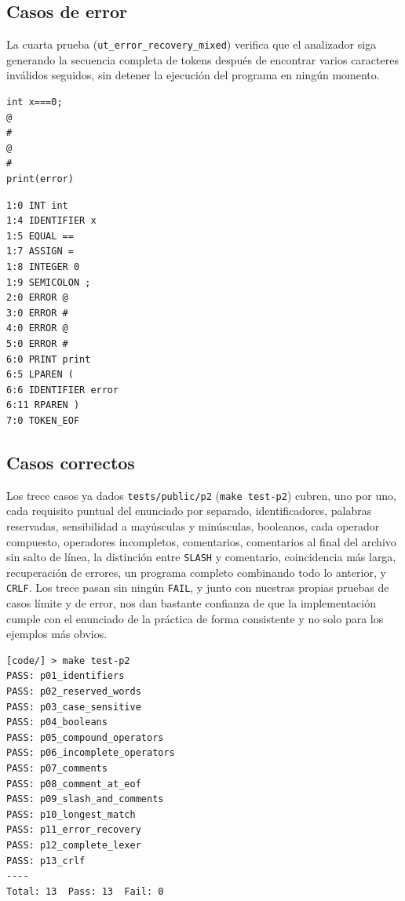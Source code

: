 \documentclass[12pt,letterpaper]{article}
\begin{document}
\subsection*{Casos de error}

La cuarta prueba (\texttt{ut\_error\_recovery\_mixed}) verifica que el analizador siga generando la secuencia
completa de tokens después de encontrar varios caracteres inválidos seguidos, sin detener la ejecución del
programa en ningún momento.

\begin{verbatim}
int x===0;
@
#
@
#
print(error)
\end{verbatim}

\begin{verbatim}
1:0 INT int
1:4 IDENTIFIER x
1:5 EQUAL ==
1:7 ASSIGN =
1:8 INTEGER 0
1:9 SEMICOLON ;
2:0 ERROR @
3:0 ERROR #
4:0 ERROR @
5:0 ERROR #
6:0 PRINT print
6:5 LPAREN (
6:6 IDENTIFIER error
6:11 RPAREN )
7:0 TOKEN_EOF
\end{verbatim}

\subsection*{Casos correctos}

Los trece casos ya dados \texttt{tests/public/p2} (\texttt{make test-p2}) cubren, uno por uno, cada
requisito puntual del enunciado por separado, identificadores, palabras reservadas, sensibilidad a mayúsculas
y minúsculas, booleanos, cada operador compuesto, operadores incompletos, comentarios, comentarios al final
del archivo sin salto de línea, la distinción entre \texttt{SLASH} y comentario, coincidencia más larga,
recuperación de errores, un programa completo combinando todo lo anterior, y \texttt{CRLF}. Los trece pasan
sin ningún \texttt{FAIL}, y junto con nuestras propias pruebas de casos límite y de error, nos dan bastante
confianza de que la implementación cumple con el enunciado de la práctica de forma consistente y no solo para
los ejemplos más obvios.

\begin{verbatim}
[code/] > make test-p2
PASS: p01_identifiers
PASS: p02_reserved_words
PASS: p03_case_sensitive
PASS: p04_booleans
PASS: p05_compound_operators
PASS: p06_incomplete_operators
PASS: p07_comments
PASS: p08_comment_at_eof
PASS: p09_slash_and_comments
PASS: p10_longest_match
PASS: p11_error_recovery
PASS: p12_complete_lexer
PASS: p13_crlf
----
Total: 13  Pass: 13  Fail: 0
\end{verbatim}
\end{document}
